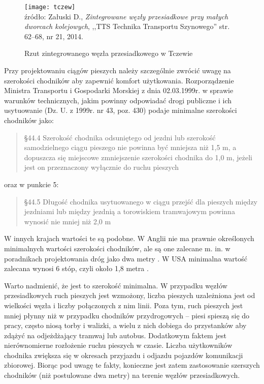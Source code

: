 \documentclass[twoside,12pt]{article}
\begin{document}
	\begin{figure}[H]
		\centering
		\caption{Rzut zintegrowanego węzła przesiadkowego w Tczewie}
		\texttt{[image: tczew]}\\
		\footnotesize{źródło: Załuski D., \emph{Zintegrowane węzły przesiadkowe przy małych dworcach kolejowych}, ,,TTS Technika Transportu Szynowego'' str. 62--68, nr 21, 2014. \cite{zaluski}}
		\label{tczew}
	\end{figure}
	
	\begin{samepage}Przy projektowaniu ciągów pieszych należy szczególnie zwrócić uwagę na szerokości chodników aby zapewnić komfort użytkowania. Rozporządzenie Ministra Transportu i Gospodarki Morskiej z dnia 02.03.1999r. w sprawie warunków technicznych, jakim powinny odpowiadać drogi publiczne i ich usytuowanie (Dz. U. z 1999r. nr 43, poz. 430)  podaje minimalne szerokości chodników jako: 
	\begin{quote}
	§44.4 Szerokość chodnika odsuniętego od jezdni lub szerokość samodzielnego ciągu pieszego nie powinna być mniejsza niż 1,5 m, a dopuszcza się miejscowe zmniejszenie szerokości chodnika do 1,0 m, jeżeli jest on przeznaczony wyłącznie do ruchu pieszych \cite{rozporzadzenie_drogi}
\end{quote}
	 oraz w punkcie 5: 
\begin{quote}
	 §44.5 Długość chodnika usytuowanego w ciągu przejść dla pieszych między jezdniami lub między jezdnią a torowiskiem tramwajowym powinna wynosić nie mniej niż 2,0 m \cite{rozporzadzenie_drogi}
	 \end{quote}\end{samepage}
	 
	 W innych krajach wartości te są podobne. W Anglii nie ma prawnie określonych minimalnych wartości szerokości chodników, ale są one zalecane m. in. w poradnikach projektowania dróg jako dwa metry \cite{young}. W USA minimalna wartość zalecana wynosi 6 stóp, czyli około 1,8 metra \cite{guidelines_washington}. 
	 
	 Warto nadmienić, że jest to szerokość minimalna. W przypadku węzłów przesiadkowych ruch pieszych jest wzmożony, liczba pieszych uzależniona jest od wielkości węzła i liczby połączonych z nim linii. Poza tym, ruch pieszych jest mniej płynny niż w przypadku chodników przydrogowych -- piesi spieszą się do pracy, często niosą torby i walizki, a wielu z nich dobiega do przystanków aby zdążyć na odjeżdżający tramwaj lub autobus. Dodatkowym faktem jest nierównomierne rozłożenie ruchu pieszych w czasie. Liczba użytkowników chodnika zwiększa się w okresach przyjazdu i odjazdu pojazdów komunikacji zbiorowej. Biorąc pod uwagę te fakty, konieczne jest zatem zastosowanie szerszych chodników (niż postulowane dwa metry) na terenie węzłów przesiadkowych. 
	 
\end{document}
